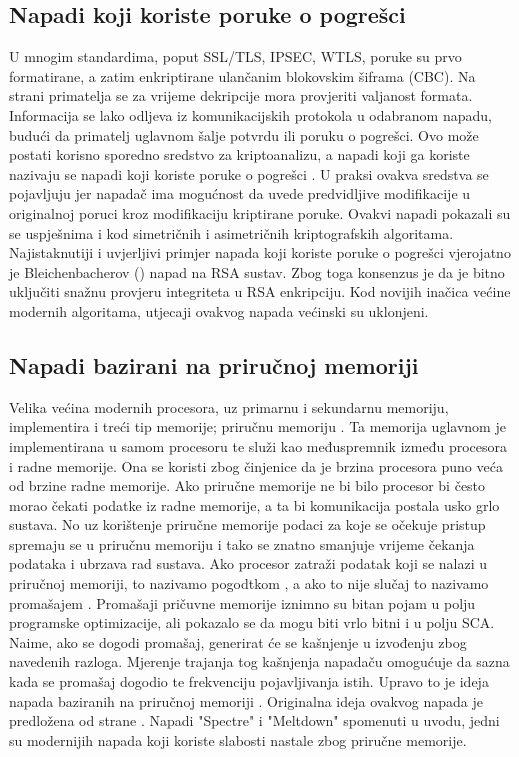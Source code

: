 \documentclass[times, utf8, diplomski]{fer}
\begin{document}
\subsection{Napadi koji koriste poruke o pogrešci}
U mnogim standardima, poput SSL/TLS, IPSEC, WTLS, poruke su prvo formatirane, a zatim enkriptirane ulančanim blokovskim šiframa (CBC). Na strani primatelja se za vrijeme dekripcije mora provjeriti valjanost formata. Informacija se lako odljeva iz komunikacijskih protokola u odabranom napadu, budući da primatelj uglavnom šalje potvrdu ili poruku o pogrešci. Ovo može postati korisno sporedno sredstvo za kriptoanalizu, a napadi koji ga koriste nazivaju se napadi koji koriste poruke o pogrešci . U praksi ovakva sredstva se pojavljuju jer napadač ima mogućnost da uvede predvidljive modifikacije u originalnoj poruci kroz modifikaciju kriptirane poruke. Ovakvi napadi pokazali su se uspješnima i kod simetričnih i asimetričnih kriptografskih algoritama. Najistaknutiji i uvjerljivi primjer napada koji koriste poruke o pogrešci vjerojatno je Bleichenbacherov (\citeyear{bleichenbacher1998chosen}) napad na RSA sustav. Zbog toga konsenzus je da je bitno uključiti snažnu provjeru integriteta u RSA enkripciju. Kod novijih inačica većine modernih algoritama, utjecaji ovakvog napada većinski su uklonjeni.

\subsection{Napadi bazirani na priručnoj memoriji}

Velika većina modernih procesora, uz primarnu i sekundarnu memoriju, implementira i treći tip memorije; priručnu memoriju .
Ta memorija uglavnom je implementirana u samom procesoru te služi kao međuspremnik između procesora i radne memorije. Ona se koristi zbog činjenice da je brzina procesora puno veća od brzine radne memorije. Ako priručne memorije ne bi bilo procesor bi često morao čekati podatke iz radne memorije, a ta bi komunikacija postala usko grlo  sustava. No uz korištenje priručne memorije podaci za koje se očekuje pristup spremaju se u priručnu memoriju i tako se znatno smanjuje vrijeme čekanja podataka i ubrzava rad sustava. Ako procesor zatraži podatak koji se nalazi u priručnoj memoriji, to nazivamo pogodtkom , a ako to nije slučaj to nazivamo promašajem . Promašaji pričuvne memorije iznimno su bitan pojam u polju programske optimizacije, ali pokazalo se da mogu biti vrlo bitni i u polju SCA. Naime, ako se dogodi promašaj, generirat će se kašnjenje u izvođenju zbog navedenih razloga. Mjerenje trajanja tog kašnjenja napadaču omogućuje da sazna kada se promašaj dogodio te frekvenciju pojavljivanja istih. Upravo to je ideja napada baziranih na priručnoj memoriji . Originalna ideja ovakvog napada je predložena od strane \cite{kelsey1998side}. Napadi "Spectre" i "Meltdown" spomenuti u uvodu, jedni su modernijih napada koji koriste slabosti nastale zbog priručne memorije.
\end{document}
